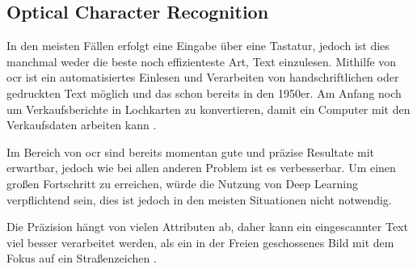 \subsection{Optical Character Recognition}

In den meisten Fällen erfolgt eine Eingabe über eine Tastatur, jedoch ist dies manchmal weder die beste noch effizienteste Art, Text einzulesen. Mithilfe von \gls{ocr} ist ein automatisiertes Einlesen und Verarbeiten von handschriftlichen oder gedruckten Text möglich und das schon bereits in den 1950er. Am Anfang noch um Verkaufsberichte in Lochkarten zu konvertieren, damit ein Computer mit den Verkaufsdaten arbeiten kann \cite{OCR:online}.

Im Bereich von \gls{ocr} sind bereits momentan gute und präzise Resultate mit  erwartbar, jedoch wie bei allen anderen Problem ist es verbesserbar. Um einen großen Fortschritt zu erreichen, würde die Nutzung von Deep Learning verpflichtend sein, dies ist jedoch in den meisten Situationen nicht notwendig.

Die Präzision hängt von vielen Attributen ab, daher kann ein eingescannter Text viel besser verarbeitet werden, als ein in der Freien geschossenes Bild mit dem Fokus auf ein Straßenzeichen \cite{OCR2:online}. 

